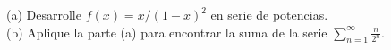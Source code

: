 \item (a) Desarrolle $f(x) = x/(1-x)^2$ en serie de potencias. \\
    (b) Aplique la parte (a) para encontrar la suma de la serie $\sum_{n=1}^\infty \frac{n}{2^n}$.
